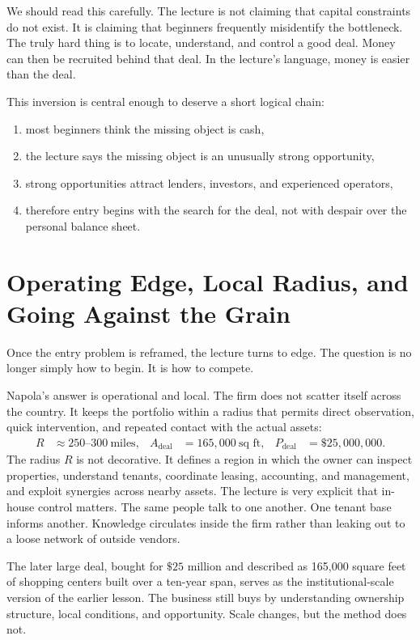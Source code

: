 We should read this carefully. The lecture is not claiming that capital constraints do not exist. It is claiming that beginners frequently misidentify the bottleneck. The truly hard thing is to locate, understand, and control a good deal. Money can then be recruited behind that deal. In the lecture's language, money is easier than the deal.

This inversion is central enough to deserve a short logical chain:
\begin{enumerate}
\item most beginners think the missing object is cash,
\item the lecture says the missing object is an unusually strong opportunity,
\item strong opportunities attract lenders, investors, and experienced operators,
\item therefore entry begins with the search for the deal, not with despair over the personal balance sheet.
\end{enumerate}

\section{Operating Edge, Local Radius, and Going Against the Grain}

Once the entry problem is reframed, the lecture turns to edge. The question is no longer simply how to begin. It is how to compete.

Napola's answer is operational and local. The firm does not scatter itself across the country. It keeps the portfolio within a radius that permits direct observation, quick intervention, and repeated contact with the actual assets:
\begin{align}
R &\approx 250\text{--}300\ \text{miles}, &
A_{\text{deal}} &= 165{,}000\ \text{sq ft}, &
P_{\text{deal}} &= \$25{,}000{,}000.
\end{align}
The radius \(R\) is not decorative. It defines a region in which the owner can inspect properties, understand tenants, coordinate leasing, accounting, and management, and exploit synergies across nearby assets. The lecture is very explicit that in-house control matters. The same people talk to one another. One tenant base informs another. Knowledge circulates inside the firm rather than leaking out to a loose network of outside vendors.

The later large deal, bought for \(\$25\) million and described as 165,000 square feet of shopping centers built over a ten-year span, serves as the institutional-scale version of the earlier lesson. The business still buys by understanding ownership structure, local conditions, and opportunity. Scale changes, but the method does not.


